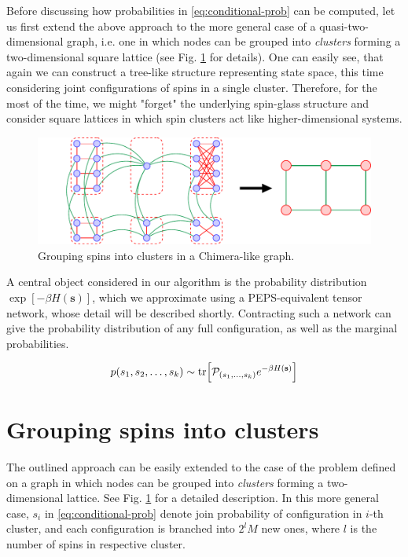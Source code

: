 Before discussing how probabilities in \eqref{eq:conditional-prob} can be
computed, let us first extend the above approach to the more general case of a
quasi-two-dimensional graph, i.e. one in which nodes can be grouped into
\emph{clusters} forming a two-dimensional square lattice (see Fig.
\ref{fig:clustering} for details). One can easily see, that again we can
construct a tree-like structure representing state space, this time considering
joint configurations of spins in a single cluster. Therefore, for the most of
the time, we might "forget" the underlying spin-glass structure and consider
square lattices in which spin clusters act like higher-dimensional systems.

\begin{figure}
  \includegraphics[width=\textwidth]{figures/clustering}
  \caption{Grouping spins into clusters in a Chimera-like graph.} \label{fig:clustering}
\end{figure}

A central object considered in our algorithm is the probability distribution
$\exp[-\beta H(\mathbf{s})]$, which we approximate using a PEPS-equivalent
tensor network, whose detail will be described shortly. Contracting such a
network can give the probability distribution of any full configuration, as
well as the marginal probabilities.

\begin{equation}
  p(s_1, s_2, \ldots, s_k) \sim \tr[\mathcal{P}_{(s_1, \ldots, s_k)} e^{-\beta H(\mathbf{s})}]
\end{equation}

\section{Grouping spins into clusters}
The outlined approach can be easily extended to the case of the problem defined
on a graph in which nodes can be grouped into \emph{clusters} forming a
two-dimensional lattice. See Fig. \ref{fig:clustering} for a detailed description.
In this more general case, $s_i$ in \eqref{eq:conditional-prob} denote join
probability of configuration in $i$-th cluster, and each configuration is
branched into $2^lM$ new ones, where $l$ is the number of spins in respective
cluster.

